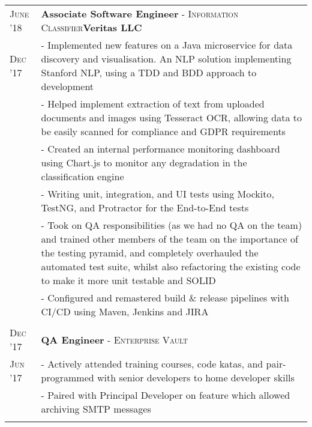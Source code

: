 \documentclass[a4paper,10pt]{extarticle} %
\begin{document}
{\begin{tabularx}{\linewidth}{ l | X }
\textsc{June '18} & \textbf{Associate Software Engineer} \textsc{ - Information Classifier}\hfill\textbf{Veritas LLC}\\
\textsc{Dec '17} & {\raggedright - Implemented new features on a Java microservice for data discovery and visualisation. An NLP solution implementing Stanford NLP, using a TDD and BDD approach to development}\\
& {- Helped implement extraction of text from uploaded documents and images using Tesseract OCR, allowing data to be easily scanned for compliance and GDPR requirements}\\
& {- Created an internal performance monitoring dashboard using Chart.js to monitor any degradation in the classification engine}\\
& {- Writing unit, integration, and UI tests using Mockito, TestNG, and Protractor for the End-to-End tests}\\
& {- Took on QA responsibilities (as we had no QA on the team) and trained other members of the team on the importance of the testing pyramid, and completely overhauled the automated test suite, whilst also refactoring the existing code to make it more unit testable and SOLID}\\
& {- Configured and remastered build \& release pipelines with CI/CD using Maven, Jenkins and JIRA}\\

\\


\textsc{Dec '17} & \textbf{QA Engineer} \textsc{ - Enterprise Vault}\hfill\\
\textsc{Jun '17} & {- Actively attended training courses, code katas, and pair-programmed with senior developers to home developer skills}\\
& {- Paired with Principal Developer on feature which allowed archiving SMTP messages}\\
\\


\end{tabularx}}
\end{document}
